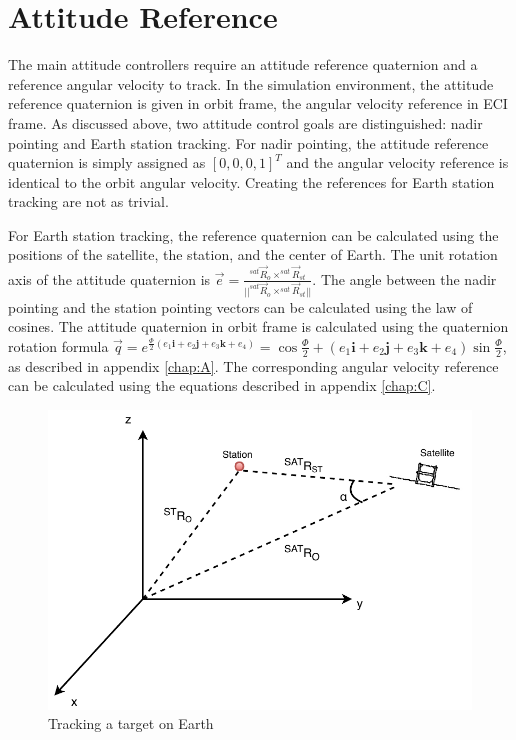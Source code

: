 \section{Attitude Reference}

The main attitude controllers require an attitude reference quaternion and a reference angular velocity to track. In the simulation environment, the attitude reference quaternion is given in orbit frame, the angular velocity reference in ECI frame. As discussed above, two attitude control goals are distinguished: nadir pointing and Earth station tracking. For nadir pointing, the attitude reference quaternion is simply assigned as $[0, 0, 0, 1]^T$ and the angular velocity reference is identical to the orbit angular velocity. Creating the references for Earth station tracking are not as trivial.

For Earth station tracking, the reference quaternion can be calculated using the positions of the satellite, the station, and the center of Earth. The unit rotation axis of the attitude quaternion is $\vec{e} = \frac{^{sat}\vec{R}_{o} \times ^{sat}\vec{R}_{st}}{||^{sat}\vec{R}_{o} \times ^{sat}\vec{R}_{st}||}$. The angle between the nadir pointing and the station pointing vectors can be calculated using the law of cosines. The attitude quaternion in orbit frame is calculated using the quaternion rotation formula $ \vec q = e^{\frac{\Phi}{2} (e_1 \textbf{i}+ e_2 \textbf{j} + e_3 \textbf{k} + e_4)} = \cos \frac{\Phi}{2} + (e_1 \textbf{i}+ e_2 \textbf{j} + e_3 \textbf{k} +e_4) \sin \frac{\Phi}{2}$, as described in appendix \ref{chap:A}. The corresponding angular velocity reference can be calculated using the equations described in appendix \ref{chap:C}.



%
%
%

\begin{figure}[H]
	\centering
	\includegraphics[width=0.7\linewidth]{figures/ST}
	\caption{Tracking a target on Earth }
	\label{fig:TS}
\end{figure}
